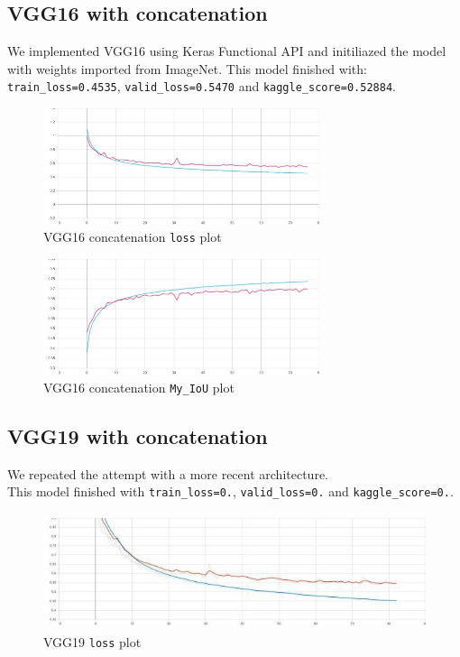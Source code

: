 \documentclass{article}
\begin{document}
		\subsection{VGG16 with concatenation}
					
			We implemented VGG16 using Keras Functional API and initiliazed the model with weights imported from ImageNet. This model finished with: \\ \texttt{train\_loss=0.4535}, \texttt{valid\_loss=0.5470} and \texttt{kaggle\_score=0.52884}.
		
			\begin{figure}[H]
				\centering
				\includegraphics[height=3.4cm, keepaspectratio]{Trans_Lear_VGG16_Conc_Dec16_04-04-00_loss}
				\caption{VGG16 concatenation \texttt{loss} plot}
			\end{figure}
	
			\begin{figure}[H]
				\centering
				\includegraphics[height=3.4cm, keepaspectratio]{Trans_Lear_VGG16_Conc_Dec16_04-04-00_my_IoU}
				\caption{VGG16 concatenation \texttt{My\_IoU} plot}
			\end{figure}
		
		\subsection{VGG19 with concatenation}
		
			We repeated the attempt with a more recent architecture. \\
			
			This model finished with \texttt{train\_loss=0.}, \texttt{valid\_loss=0.} and \texttt{kaggle\_score=0.}.
			
			\begin{figure}[H]
				\centering
				\includegraphics[height=3.4cm, keepaspectratio]{VGG19_Dec17_loss.jpg}
				\caption{VGG19 \texttt{loss} plot}
			\end{figure}
	
\end{document}
